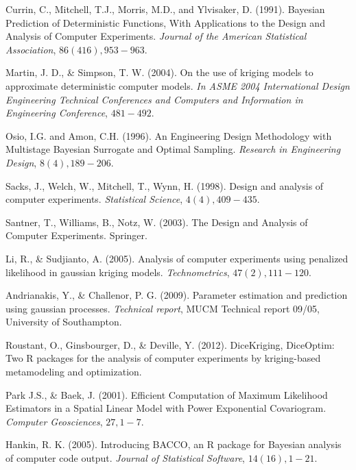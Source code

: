 
\begin{thebibliography}{94}

 Currin, C., Mitchell, T.J., Morris, M.D., and Ylvisaker, D. (1991). Bayesian Prediction of Deterministic Functions, With Applications to the Design and Analysis of Computer Experiments. {\it Journal of the American Statistical Association}, $86(416), 953-963$. 

 Martin, J. D., \& Simpson, T. W. (2004). On the use of kriging models to approximate deterministic computer models. {\it In ASME 2004 International Design Engineering Technical Conferences and Computers and Information in Engineering Conference}, $481-492$.

 Osio, I.G. and Amon, C.H. (1996). An Engineering Design Methodology with Multistage Bayesian Surrogate and Optimal Sampling. {\it Research in Engineering Design}, $8(4), 189-206$.

 Sacks, J., Welch, W., Mitchell, T., Wynn, H. (1998). Design and analysis of computer experiments. {\it Statistical Science}, $4(4), 409-435$.

 Santner, T., Williams, B., Notz, W. (2003). The Design and Analysis of Computer Experiments. Springer.

 Li, R., \& Sudjianto, A. (2005). Analysis of computer experiments using penalized likelihood in gaussian kriging models. {\it Technometrics}, $47(2), 111-120$.

 Andrianakis, Y., \& Challenor, P. G. (2009). Parameter estimation and prediction using gaussian processes. {\it Technical report}, MUCM Technical report 09/05, University of Southampton.

 Roustant, O., Ginsbourger, D., \& Deville, Y. (2012). DiceKriging, DiceOptim: Two R packages for the analysis of computer experiments by kriging-based metamodeling and optimization.

 Park J.S., \& Baek, J. (2001). Efficient Computation of Maximum Likelihood Estimators in a
Spatial Linear Model with Power Exponential Covariogram. {\it Computer Geosciences}, $27, 1-7$.

 Hankin, R. K. (2005). Introducing BACCO, an R package for Bayesian analysis of computer code output. {\it Journal of Statistical Software}, $14(16), 1-21$.


\end{thebibliography}
